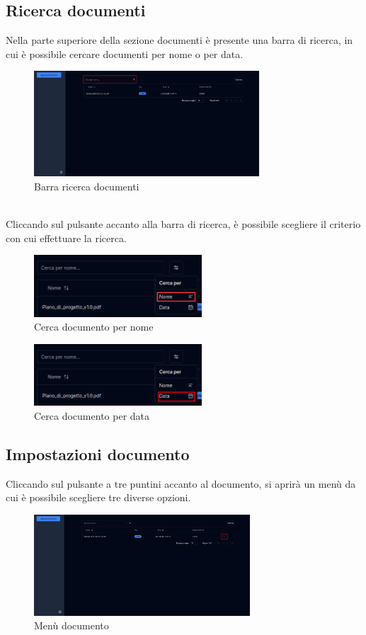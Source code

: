 \subsection{Ricerca documenti}
Nella parte superiore della sezione documenti è presente una barra di ricerca, in cui è possibile cercare documenti per nome o per data.
\begin{figure}[h!]
    \centering
    \includegraphics[width=0.75\textwidth]{schermatadocsearch.png}
    \caption{Barra ricerca documenti}\label{fig:searchdocs}
\end{figure}
\\Cliccando sul pulsante accanto alla barra di ricerca, è possibile scegliere il criterio con cui effettuare la ricerca.
\begin{figure}[h!]
    \centering
    \includegraphics[width=0.56\textwidth]{cercadocnome.png}
    \caption{Cerca documento per nome}\label{fig:searchdocsname}
\end{figure}
\begin{figure}[h!]
    \centering
    \includegraphics[width=0.56\textwidth]{cercadocdata.png}
    \caption{Cerca documento per data}\label{fig:searchdocsdate}
\end{figure}
\subsection{Impostazioni documento}
Cliccando sul pulsante a tre puntini accanto al documento, si aprirà un menù da cui è possibile scegliere tre diverse opzioni.
\begin{figure}[h!]
    \centering
    \includegraphics[width=0.72\textwidth]{schermatadoctrepunti.png}
    \caption{Menù documento}\label{fig:menudocs}
\end{figure}
